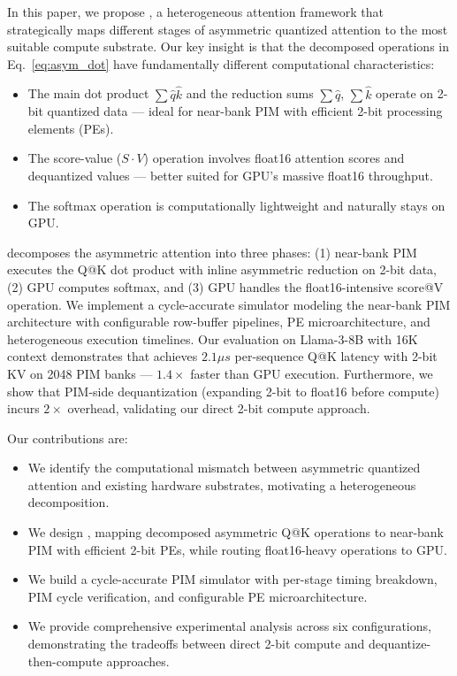 
In this paper, we propose \pimattn{}, a heterogeneous attention framework that strategically maps different stages of asymmetric quantized attention to the most suitable compute substrate.
Our key insight is that the decomposed operations in Eq.~\ref{eq:asym_dot} have fundamentally different computational characteristics:
\begin{itemize}
\item The main dot product $\sum \hat{q}\hat{k}$ and the reduction sums $\sum\hat{q}$, $\sum\hat{k}$ operate on 2-bit quantized data — ideal for near-bank PIM with efficient 2-bit processing elements (PEs).
\item The score-value ($S\cdot V$) operation involves float16 attention scores and dequantized values — better suited for GPU's massive float16 throughput.
\item The softmax operation is computationally lightweight and naturally stays on GPU.
\end{itemize}

\pimattn{} decomposes the asymmetric attention into three phases: (1) near-bank PIM executes the Q@K dot product with inline asymmetric reduction on 2-bit data, (2) GPU computes softmax, and (3) GPU handles the float16-intensive score@V operation.
We implement a cycle-accurate simulator modeling the near-bank PIM architecture with configurable row-buffer pipelines, PE microarchitecture, and heterogeneous execution timelines.
Our evaluation on Llama-3-8B with 16K context demonstrates that \pimattn{} achieves $2.1\mu s$ per-sequence Q@K latency with 2-bit KV on 2048 PIM banks — $1.4\times$ faster than GPU execution.
Furthermore, we show that PIM-side dequantization (expanding 2-bit to float16 before compute) incurs $2\times$ overhead, validating our direct 2-bit compute approach.

Our contributions are:
\begin{itemize}
\item We identify the computational mismatch between asymmetric quantized attention and existing hardware substrates, motivating a heterogeneous decomposition.
\item We design \pimattn{}, mapping decomposed asymmetric Q@K operations to near-bank PIM with efficient 2-bit PEs, while routing float16-heavy operations to GPU.
\item We build a cycle-accurate PIM simulator with per-stage timing breakdown, PIM cycle verification, and configurable PE microarchitecture.
\item We provide comprehensive experimental analysis across six configurations, demonstrating the tradeoffs between direct 2-bit compute and dequantize-then-compute approaches.
\end{itemize}
